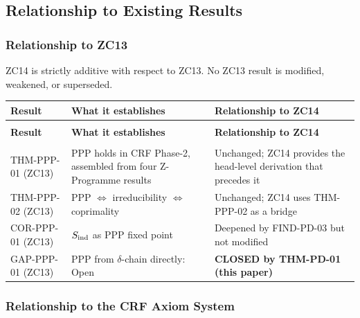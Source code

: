 \documentclass[12pt, a4paper]{article}
\begin{document}
\subsection{Relationship to Existing Results}
\label{zc14:sec:relation}

\subsubsection{Relationship to ZC13}

ZC14 is strictly additive with respect to ZC13. No ZC13 result
is modified, weakened, or superseded.

\begin{center}
{\small
\renewcommand{\arraystretch}{1.30}
\begin{longtable}{>{\raggedright\arraybackslash}p{3.0cm}
                  >{\raggedright\arraybackslash}p{5.5cm}
                  >{\raggedright\arraybackslash}p{4.0cm}}
\toprule
\textbf{Result} & \textbf{What it establishes} &
\textbf{Relationship to ZC14} \\
\midrule
\endfirsthead
\multicolumn{3}{l}{\small\textit{(continued)}} \\[4pt]
\toprule
\textbf{Result} & \textbf{What it establishes} &
\textbf{Relationship to ZC14} \\
\midrule
\endhead
\midrule
\multicolumn{3}{r}{\small\textit{(continues)}} \\
\endfoot
\bottomrule
\endlastfoot
THM-PPP-01 (ZC13) & PPP holds in CRF Phase-2, assembled from
  four Z-Programme results & Unchanged; ZC14 provides the
  head-level derivation that precedes it \\
THM-PPP-02 (ZC13) & PPP $\Leftrightarrow$ irreducibility
  $\Leftrightarrow$ coprimality & Unchanged; ZC14 uses
  THM-PPP-02 as a bridge \\
COR-PPP-01 (ZC13) & $S_{\rm ind}$ as PPP fixed point &
  Deepened by FIND-PD-03 but not modified \\
GAP-PPP-01 (ZC13) & PPP from $\delta$-chain directly: Open &
  \textbf{CLOSED by THM-PD-01 (this paper)} \\
\end{longtable}
}
\end{center}

\subsubsection{Relationship to the CRF Axiom System}
\end{document}
